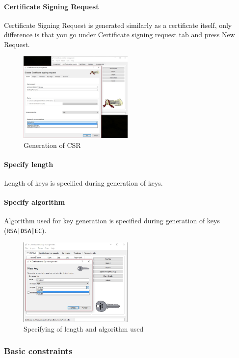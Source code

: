 \documentclass[10pt, a4paper]{report}
\begin{document}
{      \paragraph{Certificate Signing Request}
Certificate Signing Request is generated similarly as a certificate itself, only difference is that you go under Certificate signing request tab and press New Request.
\begin{figure}[!ht]
 \caption{Generation of CSR}
 \centering
  \includegraphics[width=0.5\textwidth]{../Dependancies/XCA/newCSR.jpg}
\end{figure}

      \paragraph{Specify length}
Length of keys is specified during generation of keys.
      \paragraph{Specify algorithm}
Algorithm used for key generation is specified during generation of keys (\verb+RSA|DSA|EC+).
\begin{figure}[!ht]
 \caption{Specifying of length and algorithm used}
 \centering
  \includegraphics[width=0.5\textwidth]{../Dependancies/XCA/genKeylength.jpg}
\end{figure}


    \subsubsection{Basic constraints}
    
}
\end{document}
